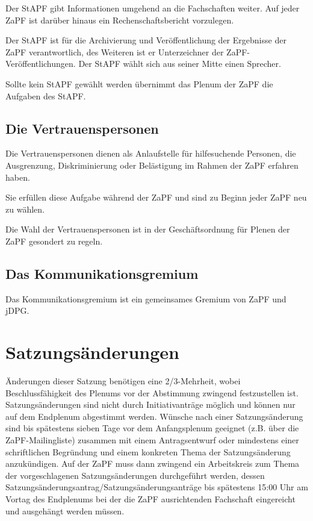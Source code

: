 \documentclass[draft,12pt,oneside]{scrreprt}
\begin{document}
Der StAPF gibt Informationen umgehend an die Fachschaften weiter.
Auf jeder ZaPF ist darüber hinaus ein Rechenschaftsbericht vorzulegen.

Der StAPF ist für die Archivierung und Veröffentlichung der Ergebnisse der ZaPF
verantwortlich, des Weiteren ist er Unterzeichner der ZaPF-Veröffentlichungen.
Der StAPF wählt sich aus seiner Mitte einen Sprecher.

Sollte kein StAPF gewählt werden übernimmt das Plenum der ZaPF die Aufgaben des StAPF.

\subsection{Die Vertrauenspersonen}

Die Vertrauenspersonen dienen als Anlaufstelle für hilfesuchende Personen, die
Ausgrenzung, Diskriminierung oder Belästigung im Rahmen der ZaPF erfahren haben.

Sie erfüllen diese Aufgabe während der ZaPF und sind zu Beginn jeder ZaPF neu
zu wählen.

Die Wahl der Vertrauenspersonen ist in der Geschäftsordnung für Plenen der ZaPF
gesondert zu regeln.

\subsection{Das Kommunikationsgremium}

Das Kommunikationsgremium ist ein gemeinsames Gremium von ZaPF und jDPG.

\section{Satzungsänderungen}
Änderungen dieser Satzung benötigen eine 2/3-Mehrheit, wobei Beschlussfähigkeit
des Plenums vor der Abstimmung zwingend festzustellen ist. Satzungsänderungen
sind nicht durch Initiativanträge möglich und können nur auf dem Endplenum
abgestimmt werden. Wünsche nach einer Satzungsänderung sind bis spätestens
sieben Tage vor dem Anfangsplenum geeignet (z.B. über die ZaPF-Mailingliste)
zusammen mit einem Antragsentwurf oder mindestens einer schriftlichen
Begründung und einem konkreten Thema der Satzungsänderung anzukündigen. Auf der
ZaPF muss dann zwingend ein Arbeitskreis zum Thema der vorgeschlagenen
Satzungsänderungen durchgeführt werden, dessen
Satzungsänderungsantrag/Satzungsänderungsanträge bis spätestens 15:00 Uhr am
Vortag des Endplenums bei der die ZaPF ausrichtenden Fachschaft eingereicht und
ausgehängt werden müssen.
\end{document}
